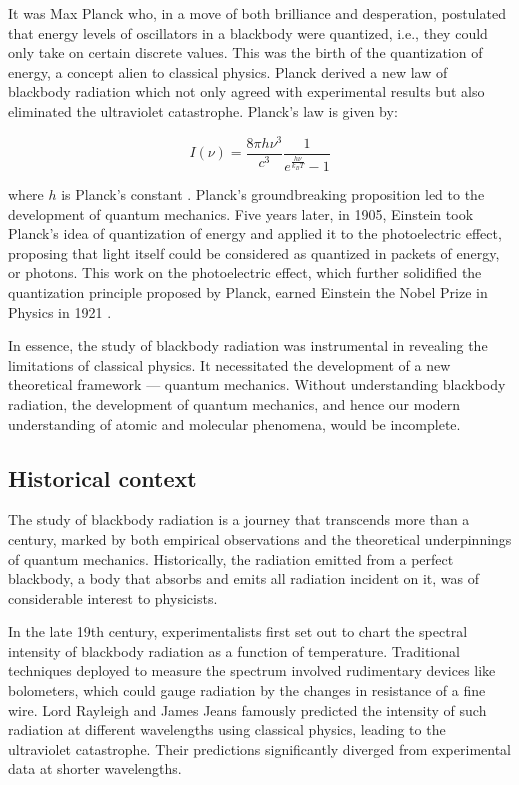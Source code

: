 \documentclass[10pt,letterpaper,onecolumn]{article}
\begin{document}
It was Max Planck who, in a move of both brilliance and desperation, 
postulated that energy levels of oscillators in a blackbody were quantized, 
i.e., they could only take on certain discrete values. This was the birth 
of the quantization of energy, a concept alien to classical physics. 
Planck derived a new law of blackbody radiation which not only agreed 
with experimental results but also eliminated the ultraviolet catastrophe. 
Planck's law is given by:

\begin{equation}
I(\nu) = \frac{8 \pi h \nu^3}{c^3} \frac{1}{e^{\frac{h \nu}{k_B T}} - 1}
\end{equation}

where \( h \) is Planck's constant \cite{planck1901}.
Planck's groundbreaking proposition led to the development of 
quantum mechanics. Five years later, in 1905, Einstein took Planck's 
idea of quantization of energy and applied it to the photoelectric effect, 
proposing that light itself could be considered as quantized in packets of 
energy, or photons. This work on the photoelectric effect, which further 
solidified the quantization principle proposed by Planck, earned Einstein 
the Nobel Prize in Physics in 1921 \cite{einstein1905}.

In essence, the study of blackbody radiation was instrumental in revealing the limitations of classical physics.
It necessitated the development of a new theoretical framework — quantum mechanics. Without understanding blackbody 
radiation, the development of quantum mechanics, and hence our modern understanding of atomic and molecular phenomena,
 would be incomplete.


\subsection{Historical context}

The study of blackbody radiation is a journey that transcends 
more than a century, marked by both empirical observations and 
the theoretical underpinnings of quantum mechanics. Historically, 
the radiation emitted from a perfect blackbody, a body that absorbs 
and emits all radiation incident on it, was of considerable interest 
to physicists.

In the late 19th century, experimentalists first set out to chart the 
spectral intensity of blackbody radiation as a function of temperature. 
Traditional techniques deployed to measure the spectrum involved rudimentary 
devices like bolometers, which could gauge radiation by the changes in 
resistance of a fine wire. Lord Rayleigh and James Jeans famously predicted 
the intensity of such radiation at different wavelengths using classical 
physics, leading to the ultraviolet catastrophe. Their predictions 
significantly diverged from experimental data at shorter wavelengths.
\end{document}
